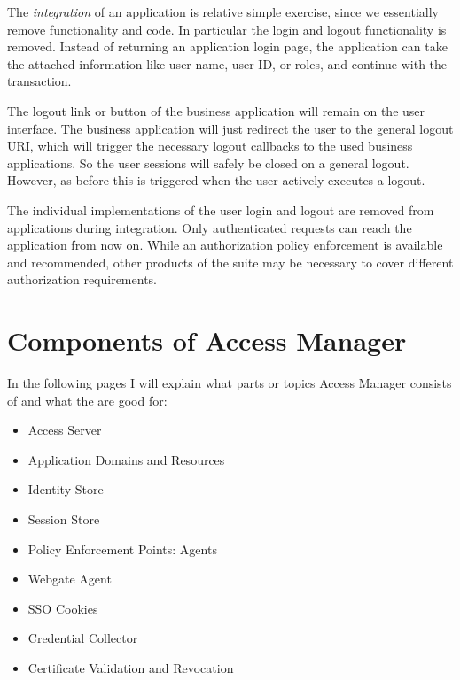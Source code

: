 The \emph{integration} of an application is relative simple exercise,
since we essentially remove functionality and code. In particular the
login and logout functionality is removed. Instead of returning an
application login page, the application can take the attached
information like user name, user ID, or roles, and continue with the
transaction.

The logout link or button of the business application will remain on the
user interface. The business application will just redirect the user to
the general logout URI, which will trigger the necessary logout
callbacks to the used business applications. So the user sessions will
safely be closed on a general logout. However, as before this is
triggered when the user actively executes a logout.

The individual implementations of the user login and logout are removed
from applications during integration. Only authenticated requests can
reach the application from now on. While an authorization policy
enforcement is available and recommended, other products of the suite
may be necessary to cover different authorization requirements.




\chapter{Components of Access Manager}

In the following pages I will explain what parts or topics Access
Manager consists of and what the are good for:

\begin{itemize}
    \item Access Server
    \item Application Domains and Resources
    \item Identity Store
    \item Session Store
    \item Policy Enforcement Points: Agents
    \item Webgate Agent
    \item SSO Cookies
    \item Credential Collector
    \item Certificate Validation and Revocation
\end{itemize}




